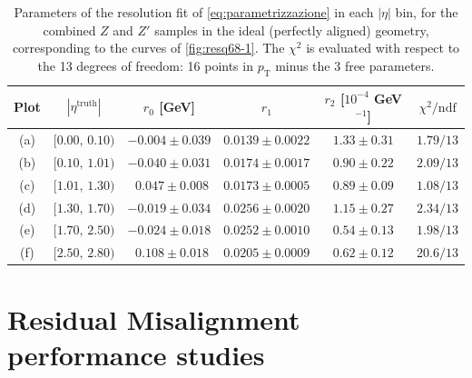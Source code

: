\documentclass[11pt,a4paper,twoside,openright]{report}
\begin{document}
\begin{table}[htbp]
    \centering
    \begin{tabular}{c c c c c c}
        \toprule
        Plot & $|\eta^{\mathrm{truth}}|$ & $r_0$ [GeV] & $r_1$ & $r_2$ [$10^{-4}$ GeV$^{-1}$] & $\chi^2/\mathrm{ndf}$ \\
        \midrule
        (a) & $[0.00,\,0.10)$ & $-0.004 \pm 0.039$ & $0.0139 \pm 0.0022$ & $1.33 \pm 0.31$ & $1.79/13$ \\
        (b) & $[0.10,\,1.01)$ & $-0.040 \pm 0.031$ & $0.0174 \pm 0.0017$ & $0.90 \pm 0.22$ & $2.09/13$ \\
        (c) & $[1.01,\,1.30)$ & $\ \ 0.047 \pm 0.008$ & $0.0173 \pm 0.0005$ & $0.89 \pm 0.09$ & $1.08/13$ \\
        (d) & $[1.30,\,1.70)$ & $-0.019 \pm 0.034$ & $0.0256 \pm 0.0020$ & $1.15 \pm 0.27$ & $2.34/13$ \\
        (e) & $[1.70,\,2.50)$ & $-0.024 \pm 0.018$ & $0.0252 \pm 0.0010$ & $0.54 \pm 0.13$ & $1.98/13$ \\
        (f) & $[2.50,\,2.80)$ & $\ \ 0.108 \pm 0.018$ & $0.0205 \pm 0.0009$ & $0.62 \pm 0.12$ & $20.6/13$ \\
        \bottomrule
    \end{tabular}
    \caption{Parameters of the resolution fit of \cref{eq:parametrizzazione} in each $|\eta|$ bin, for the combined $Z$ and $Z'$ samples in the ideal (perfectly aligned) geometry, corresponding to the curves of \cref{fig:resq68-1}. The $\chi^2$ is evaluated with respect to the 13 degrees of freedom: 16 points in $p_{\mathrm{T}}$ minus the 3 free parameters.}
    \label{tab:risultati_fit_all}
\end{table}
\section{Residual Misalignment performance studies}
\end{document}
